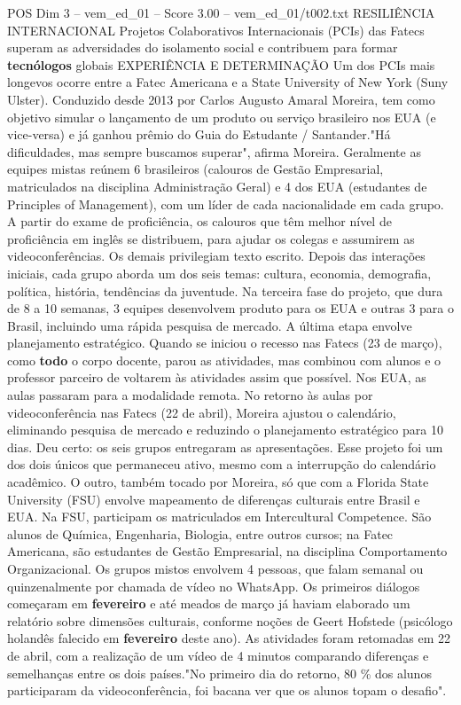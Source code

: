 \begin{textsample}{POS Dim 3 – vem\_ed\_01 – Score 3.00 – vem\_ed\_01/t002.txt}  \label{ex:f3_pos_006}
RESILIÊNCIA INTERNACIONAL Projetos Colaborativos Internacionais (PCIs) das Fatecs superam as adversidades do isolamento social e contribuem para formar \textbf{tecnólogos} globais EXPERIÊNCIA E DETERMINAÇÃO Um dos PCIs mais longevos ocorre entre a Fatec Americana e a State University of New York (Suny Ulster).
Conduzido desde 2013 por Carlos Augusto Amaral Moreira, tem como objetivo simular o lançamento de um produto ou serviço brasileiro nos EUA (e vice-versa) e já ganhou prêmio do Guia do Estudante / Santander."Há dificuldades, mas sempre buscamos superar", afirma Moreira.
Geralmente as equipes mistas reúnem 6 brasileiros (calouros de Gestão Empresarial, matriculados na disciplina Administração Geral) e 4 dos EUA (estudantes de Principles of Management), com um líder de cada nacionalidade em cada grupo.
A partir do exame de proficiência, os calouros que têm melhor nível de proficiência em inglês se distribuem, para ajudar os colegas e assumirem as videoconferências.
Os demais privilegiam texto escrito.
Depois das interações iniciais, cada grupo aborda um dos seis temas: cultura, economia, demografia, política, história, tendências da juventude.
Na terceira fase do projeto, que dura de 8 a 10 semanas, 3 equipes desenvolvem produto para os EUA e outras 3 para o Brasil, incluindo uma rápida pesquisa de mercado.
A última etapa envolve planejamento estratégico.
Quando se iniciou o recesso nas Fatecs (23 de março), como \textbf{todo} o corpo docente, parou as atividades, mas combinou com alunos e o professor parceiro de voltarem às atividades assim que possível.
Nos EUA, as aulas passaram para a modalidade remota.
No retorno às aulas por videoconferência nas Fatecs (22 de abril), Moreira ajustou o calendário, eliminando pesquisa de mercado e reduzindo o planejamento estratégico para 10 dias.
Deu certo: os seis grupos entregaram as apresentações.
Esse projeto foi um dos dois únicos que permaneceu ativo, mesmo com a interrupção do calendário acadêmico.
O outro, também tocado por Moreira, só que com a Florida State University (FSU) envolve mapeamento de diferenças culturais entre Brasil e EUA.
Na FSU, participam os matriculados em Intercultural Competence.
São alunos de Química, Engenharia, Biologia, entre outros cursos; na Fatec Americana, são estudantes de Gestão Empresarial, na disciplina Comportamento Organizacional.
Os grupos mistos envolvem 4 pessoas, que falam semanal ou quinzenalmente por chamada de vídeo no WhatsApp.
Os primeiros diálogos começaram em \textbf{fevereiro} e até meados de março já haviam elaborado um relatório sobre dimensões culturais, conforme noções de Geert Hofstede (psicólogo holandês falecido em \textbf{fevereiro} deste ano).
As atividades foram retomadas em 22 de abril, com a realização de um vídeo de 4 minutos comparando diferenças e semelhanças entre os dois países."No primeiro dia do retorno, 80 \% dos alunos participaram da videoconferência, foi bacana ver que os alunos topam o desafio".

\end{textsample}
